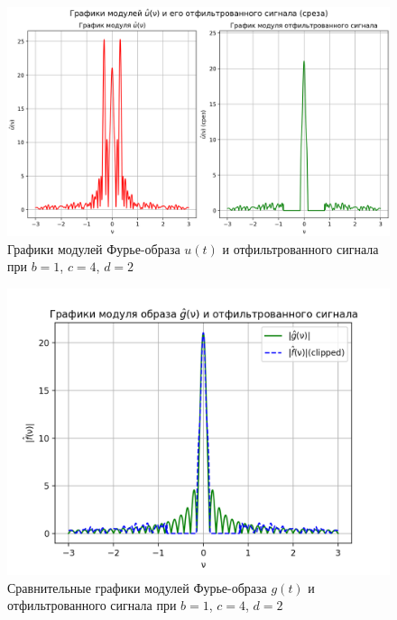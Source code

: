 \clearpage

\begin{figure}[ht!]
    \centering
    \includegraphics[scale=0.55]{media/1 task/specific_freq/Fourier_Image_1_4_2_-0,8:-0,153.png}
    \caption{Графики модулей Фурье-образа $u(t)$ и отфильтрованного сигнала при $b=1$,  $c=4$,  $d=2$}
    \label{fig:four_1_4_2}
\end{figure}


\begin{figure}[ht!]
    \centering
    \includegraphics[scale=0.55]{media/1 task/specific_freq/Fourier_Image_Comparison_1_4_2_-0,8:-0,153.png}
    \caption{Сравнительные графики модулей Фурье-образа $g(t)$ и отфильтрованного сигнала при $b=1$,  $c=4$,  $d=2$}
    \label{fig:fourc_1_4_2}
\end{figure}

